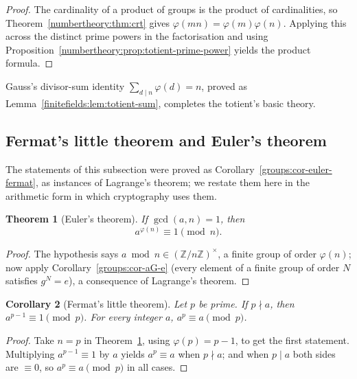 \documentclass[11pt,a4paper]{article}
\newtheorem{theorem}{Theorem}[section]
\newtheorem{corollary}[theorem]{Corollary}
\theoremstyle{definition}
\theoremstyle{remark}
\newcommand{\Z}{\ensuremath{\mathbb{Z}}}
\begin{document}
\begin{proof}
The cardinality of a product of groups is the product of cardinalities, so Theorem~\ref{numbertheory:thm:crt} gives \(\varphi(mn)=\varphi(m)\varphi(n)\). Applying this across the distinct prime powers in the factorisation and using Proposition~\ref{numbertheory:prop:totient-prime-power} yields the product formula.
\end{proof}

Gauss's divisor-sum identity \(\sum_{d \mid n} \varphi(d) = n\), proved as Lemma~\ref{finitefields:lem:totient-sum}, completes the totient's basic theory.

\subsection{Fermat's little theorem and Euler's theorem}\label{numbertheory:subsec:fermat-euler}

The statements of this subsection were proved as Corollary~\ref{groups:cor-euler-fermat}, as instances of Lagrange's theorem; we restate them here in the arithmetic form in which cryptography uses them.

\begin{theorem}[Euler's theorem]\label{numbertheory:thm:euler}
If \(\gcd(a,n)=1\), then
\[
a^{\varphi(n)} \equiv 1 \pmod{n}.
\]
\end{theorem}

\begin{proof}
The hypothesis says \(a \bmod n \in (\Z/n\Z)^\times\), a finite group of order \(\varphi(n)\); now apply Corollary~\ref{groups:cor-aG-e} (every element of a finite group of order \(N\) satisfies \(g^N = e\)), a consequence of Lagrange's theorem.
\end{proof}

\begin{corollary}[Fermat's little theorem]\label{numbertheory:cor:fermat}
Let \(p\) be prime. If \(p \nmid a\), then \(a^{p-1} \equiv 1 \pmod p\). For \emph{every} integer \(a\), \(a^{p} \equiv a \pmod p\).
\end{corollary}

\begin{proof}
Take \(n=p\) in Theorem~\ref{numbertheory:thm:euler}, using \(\varphi(p)=p-1\), to get the first statement. Multiplying \(a^{p-1}\equiv 1\) by \(a\) yields \(a^p \equiv a\) when \(p \nmid a\); and when \(p \mid a\) both sides are \(\equiv 0\), so \(a^p \equiv a \pmod p\) in all cases.
\end{proof}
\end{document}
